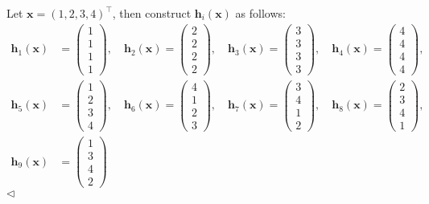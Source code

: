 \documentclass[11pt]{article}
\newenvironment{answer}[1][Answer]{\begin{trivlist}
\item[\hskip \labelsep {\bfseries #1.}\hskip \labelsep]}{\hfill$\lhd$\end{trivlist}}
\begin{document}
\begin{answer}
Let $\bm x=(1,2,3,4)^\top$, then construct $\bm h_i(\bm x)$ as follows:
\[
\begin{aligned}
\bm{h}_1(\bm{x}) &= 
\begin{pmatrix}
1 \\ 1 \\ 1 \\ 1
\end{pmatrix}, \quad
\bm{h}_2(\bm{x}) = 
\begin{pmatrix}
2 \\ 2 \\ 2 \\ 2
\end{pmatrix}, \quad
\bm{h}_3(\bm{x}) = 
\begin{pmatrix}
3 \\ 3 \\ 3 \\ 3
\end{pmatrix}, \quad
\bm{h}_4(\bm{x}) = 
\begin{pmatrix}
4 \\ 4 \\ 4 \\ 4
\end{pmatrix}, \\
\bm{h}_5(\bm{x}) &= 
\begin{pmatrix}
1 \\ 2 \\ 3 \\ 4
\end{pmatrix}, \quad
\bm{h}_6(\bm{x}) = 
\begin{pmatrix}
4 \\ 1 \\ 2 \\ 3
\end{pmatrix}, \quad
\bm{h}_7(\bm{x}) = 
\begin{pmatrix}
3 \\ 4 \\ 1 \\ 2
\end{pmatrix}, \quad
\bm{h}_8(\bm{x}) = 
\begin{pmatrix}
2 \\ 3 \\ 4 \\ 1
\end{pmatrix}, \\
\bm{h}_9(\bm{x}) &= 
\begin{pmatrix}
1 \\ 3 \\ 4 \\ 2

\end{pmatrix}
\end{aligned}\]
\end{answer}
\end{document}

